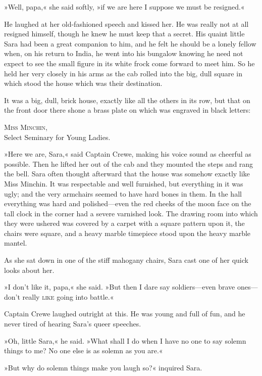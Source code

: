 »Well, papa,« she said softly, »if we are here I suppose we must be resigned.«

He laughed at her old-fashioned speech and kissed her. He was really not at all resigned himself, though he knew he must keep that a secret. His quaint little Sara had been a great companion to him, and he felt he should be a lonely fellow when, on his return to India, he went into his bungalow knowing he need not expect to see the small figure in its white frock come forward to meet him. So he held her very closely in his arms as the cab rolled into the big, dull square in which stood the house which was their destination.

It was a big, dull, brick house, exactly like all the others in its row, but that on the front door there shone a brass plate on which was engraved in black letters:

\begin{center}
\textsc{Miss Minchin},\\
Select Seminary for Young Ladies.
\end{center}

»Here we are, Sara,« said Captain Crewe, making his voice sound as cheerful as possible. Then he lifted her out of the cab and they mounted the steps and rang the bell. Sara often thought afterward that the house was somehow exactly like Miss Minchin. It was respectable and well furnished, but everything in it was ugly; and the very armchairs seemed to have hard bones in them. In the hall everything was hard and polished—even the red cheeks of the moon face on the tall clock in the corner had a severe varnished look. The drawing room into which they were ushered was covered by a carpet with a square pattern upon it, the chairs were square, and a heavy marble timepiece stood upon the heavy marble mantel.

As she sat down in one of the stiff mahogany chairs, Sara cast one of her quick looks about her.

»I don't like it, papa,« she said. »But then I dare say soldiers—even brave ones—don't really \textsc{like} going into battle.«

Captain Crewe laughed outright at this. He was young and full of fun, and he never tired of hearing Sara's queer speeches.

»Oh, little Sara,« he said. »What shall I do when I have no one to say solemn things to me? No one else is as solemn as you are.«

»But why do solemn things make you laugh so?« inquired Sara.

